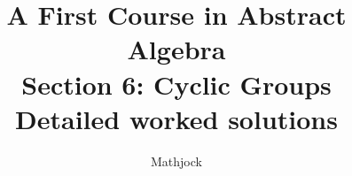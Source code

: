 
\title{\textbf{A First Course in Abstract Algebra}\\[0.3em]Section 6: Cyclic Groups\\[0.3em]\large Detailed worked solutions}
\author{Mathjock}
\date{}

\maketitle
\bookinfo
\tableofcontents
\clearpage
\renewcommand{\thesection}{6}
\renewcommand{\theHsection}{fraleigh.6}


